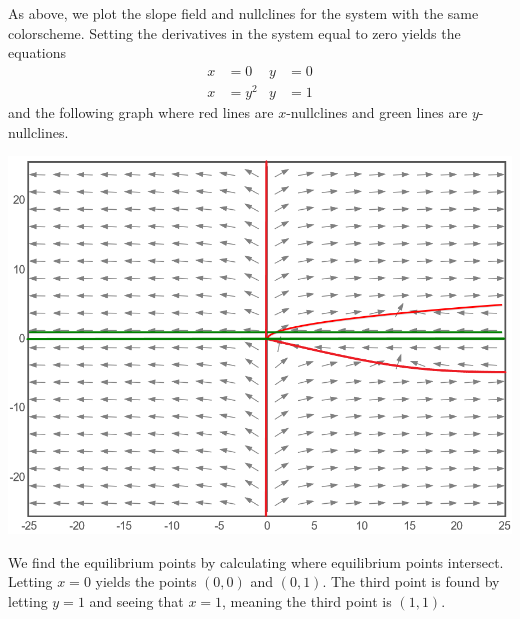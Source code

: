 \documentclass[11pt, titlepage]{article}
\begin{document}
    \begin{solution}
        As above, we plot the slope field and nullclines for the system with the
        same colorscheme. Setting the derivatives in the system equal to zero
        yields the equations
        \begin{align*}
            x &= 0 & y &= 0 \\
            x &= y^2 & y &= 1
        \end{align*}
        and the following graph where red lines are $x$-nullclines and green
        lines are $y$-nullclines.
        \begin{center}
            \includegraphics[scale=0.3]{media/slopeField2.png}
        \end{center}
        We find the equilibrium points by calculating where equilibrium points
        intersect. Letting $x = 0$ yields the points $(0, 0)$ and $(0, 1)$. The
        third point is found by letting $y = 1$ and seeing that $x = 1$, meaning
        the third point is $(1, 1)$.


\end{solution}
\end{document}
